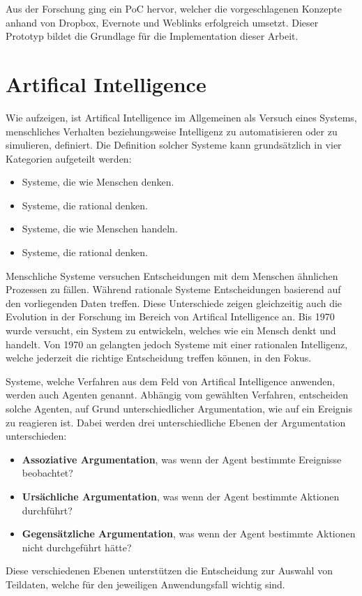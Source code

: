 Aus der Forschung ging ein \gls{PoC} hervor, welcher die vorgeschlagenen Konzepte anhand von Dropbox, Evernote und Weblinks erfolgreich umsetzt. Dieser Prototyp bildet die Grundlage für die Implementation dieser Arbeit.




\section{Artifical Intelligence}


Wie \cite{Russell:2009:AIM:1671238} aufzeigen, ist \gls{Artifical Intelligence} im Allgemeinen als Versuch eines Systems, menschliches Verhalten beziehungsweise Intelligenz zu automatisieren oder zu simulieren, definiert. Die Definition solcher Systeme kann grundsätzlich in vier Kategorien aufgeteilt werden: 

\begin{itemize}
    \item Systeme, die wie Menschen denken.
    \item Systeme, die rational denken.
    \item Systeme, die wie Menschen handeln.
    \item Systeme, die rational denken.
\end{itemize}

Menschliche Systeme versuchen Entscheidungen mit dem Menschen ähnlichen Prozessen zu fällen. Während rationale Systeme Entscheidungen basierend auf den vorliegenden Daten treffen. Diese Unterschiede zeigen gleichzeitig auch die Evolution in der Forschung im Bereich von \gls{Artifical Intelligence} an. Bis 1970 wurde versucht, ein System zu entwickeln, welches wie ein Mensch denkt und handelt. Von 1970 an gelangten jedoch Systeme mit einer rationalen Intelligenz, welche jederzeit die richtige Entscheidung treffen können, in den Fokus.

Systeme, welche Verfahren aus dem Feld von \gls{Artifical Intelligence} anwenden, werden auch Agenten genannt. Abhängig vom gewählten Verfahren, entscheiden solche Agenten, auf Grund unterschiedlicher Argumentation, wie auf ein Ereignis zu reagieren ist. Dabei werden drei unterschiedliche Ebenen der Argumentation unterschieden:
\begin{itemize}
    \item \textbf{Assoziative Argumentation}, was wenn der Agent bestimmte Ereignisse beobachtet?
    \item \textbf{Ursächliche Argumentation}, was wenn der Agent bestimmte Aktionen durchführt?
    \item \textbf{Gegensätzliche Argumentation}, was wenn der Agent bestimmte Aktionen nicht durchgeführt hätte?
\end{itemize}
Diese verschiedenen Ebenen unterstützen die Entscheidung zur Auswahl von Teildaten, welche für den jeweiligen Anwendungsfall wichtig sind.

